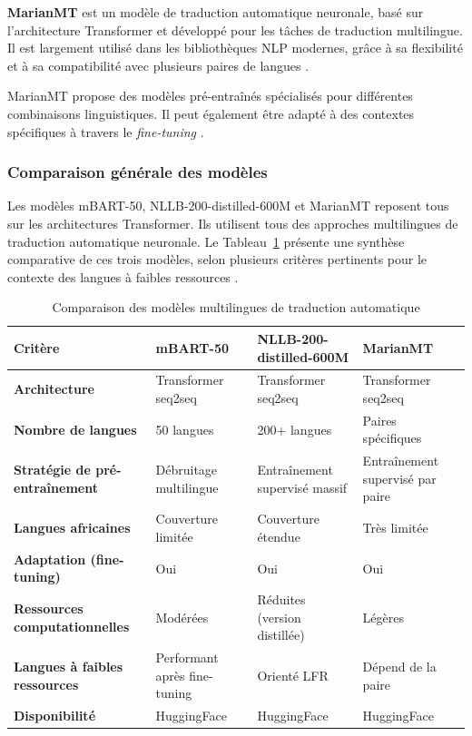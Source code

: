 \textbf{\ac{MarianMT}} est un modèle de traduction automatique neuronale, basé sur l'architecture Transformer et développé pour les tâches de traduction multilingue. Il est largement utilisé dans les bibliothèques \ac{NLP} modernes, grâce à sa flexibilité et à sa compatibilité avec plusieurs paires de langues \cite{angel2023comparing}.

MarianMT propose des modèles pré-entraînés spécialisés pour différentes combinaisons linguistiques. Il peut également être adapté à des contextes spécifiques à travers le \textit{fine-tuning} \cite{lalrempuii2023investigating}.

\subsubsection{Comparaison générale des modèles}

Les modèles mBART-50, NLLB-200-distilled-600M et MarianMT reposent tous sur les architectures Transformer. Ils utilisent tous des approches multilingues de traduction automatique neuronale. Le Tableau~\ref{tab:comparaison_modeles} présente une synthèse comparative de ces trois modèles, selon plusieurs critères pertinents pour le contexte des langues à faibles ressources \cite{kozhirbayev2024enhancing, ranathunga2023neural}.


\begin{table}[H]
\centering

\renewcommand{\arraystretch}{1.5}
\begin{tabular}{p{3.2cm}p{3.4cm}p{3.4cm}p{3.4cm}}
\toprule
\textbf{Critère} & \textbf{\ac{mBART}-50} & \textbf{\ac{NLLB}-200-distilled-600M} & \textbf{\ac{MarianMT}} \\
\midrule
\textbf{Architecture} & Transformer seq2seq & Transformer seq2seq & Transformer seq2seq \\
\textbf{Nombre de langues} & 50 langues & 200+ langues & Paires spécifiques \\
\textbf{Stratégie de pré-entraînement} & Débruitage multilingue & Entraînement supervisé massif & Entraînement supervisé par paire \\
\textbf{Langues africaines} & Couverture limitée & Couverture étendue & Très limitée \\
\textbf{Adaptation (fine-tuning)} & Oui & Oui & Oui \\
\textbf{Ressources computationnelles} & Modérées & Réduites (version distillée) & Légères \\
\textbf{Langues à faibles ressources} & Performant après fine-tuning & Orienté LFR & Dépend de la paire \\
\textbf{Disponibilité} & HuggingFace & HuggingFace & HuggingFace \\
\bottomrule
\end{tabular}
\caption{Comparaison des modèles multilingues de traduction automatique}
\label{tab:comparaison_modeles}
\end{table}

